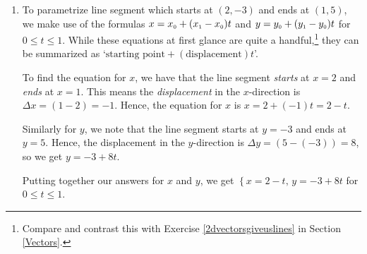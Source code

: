 \documentclass{ximera}
\begin{document}
\begin{example}
\begin{explanation}
\begin{enumerate}
 

Doing so gives us the equation $x = y^5+2y+1$.  While we could attempt to solve this equation for $y$ to get an \textit{explicit} formula for $f^{-1}(x)$, we don't need to.  We can parametrize the \textit{implicit} function\footnote{See the discussion preceding Example \ref{implicitfcnex} in Section \ref{Relations} for a review of this concept.}  $x = f(y) = y^5+2y+1$ by setting $y = t$ so that $x = t^5 + 2t + 1$.  

 

We know from  Section \ref{GraphsofPolynomials} that since $f(x) = x^5 + 2x + 1$ is an odd-degree polynomial, the range of $y = f(x) = x^5 + 2x + 1$ is $(-\infty, \infty)$.  Hence, in order to trace out the entire graph of  $x = f(y) = y^5+2y+1$, we need to let $y$ run through all real numbers.  

 

Hence, our final answer to this problem is $\left\{ x = t^5+2t+1, \, y = t \right.$ for $-\infty < t < \infty$.  As in the previous problem, our solution is trivial to check.\footnote{Provided you followed the inverse function theory, of course.}

\item  To parametrize line segment which starts at $(2,-3)$ and ends at $(1,5)$, we make use of the formulas $x = x_{\text{\tiny$0$}} + (x_{\text{\tiny$1$}} - x_{\text{\tiny$0$}}) t$ and $y = y_{\text{\tiny$0$}} + (y_{\text{\tiny$1$}} - y_{\text{\tiny$0$}}) t$ for $0 \leq t \leq 1$.    While these equations at first glance are quite a handful,\footnote{Compare and contrast this with Exercise \ref{2dvectorsgiveuslines} in Section \ref{Vectors}.} they can be summarized as `$\text{starting point} + (\text{displacement})t$'.  

 

To find the equation for $x$, we have that the line segment \textit{starts} at $x= 2$ and \textit{ends} at $x = 1$.  This means the \textit{displacement} in the $x$-direction is $\Delta x = (1-2) = -1$.  Hence, the equation for $x$ is $x = 2 + (-1)t = 2-t$.  

 

Similarly for $y$, we note that the line segment starts at $y=-3$ and ends at $y=5$.  Hence, the displacement in the $y$-direction is $\Delta y = (5-(-3)) = 8$, so we get $y = -3+8t$. 
 
  
 
Putting together our answers for $x$ and $y$, we get   $\left\{ x = 2-t, \, y = -3+8t \right.$ for $0 \leq t \leq 1$. 
  

\end{enumerate}
\end{explanation}
\end{example}
\end{document}
